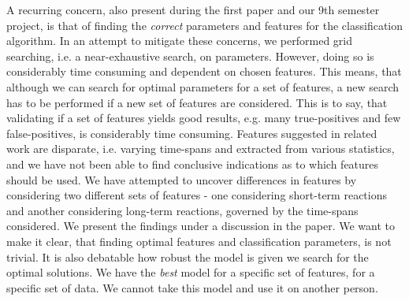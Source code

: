 A recurring concern, also present during the first paper and our 9th semester project, is that of finding the
\textit{correct} parameters and features for the classification algorithm. In an attempt to mitigate these concerns, we
performed grid searching, i.e. a near-exhaustive search, on parameters. However, doing so is considerably time consuming
and dependent on chosen features. This means, that although we can search for optimal parameters for a set of features,
a new search has to be performed if a new set of features are considered. This is to say, that validating if a set of
features yields good results, e.g. many true-positives and few false-positives, is considerably time consuming. Features
suggested in related work are disparate, i.e. varying time-spans and extracted from various statistics, and we have not
been able to find conclusive indications as to which features should be used. We have attempted to uncover differences
in features by considering two different sets of features - one considering short-term reactions and another considering
long-term reactions, governed by the time-spans considered. We present the findings under a discussion in the paper. We
want to make it clear, that finding optimal features and classification parameters, is not trivial. 
It is also debatable how robust the model is given we search for the optimal solutions. 
We have the \textit{best} model for a specific set of features, for a specific set of data. 
We cannot take this model and use it on another person. 




